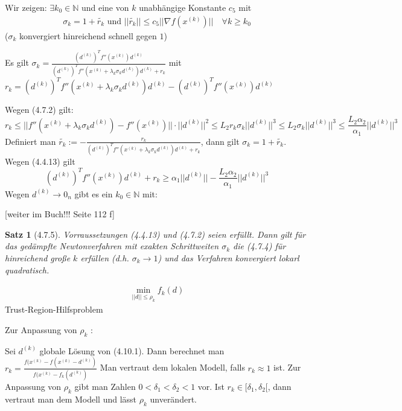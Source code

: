 \documentclass[ngerman,halfparskip]{scrartcl}
\newtheorem*{satz}{Satz}
\theoremstyle{definition}
\newcommand*{\N}{\mathbb{N}}      %
\begin{document}
Wir zeigen: $\exists k_0\in \N$ und eine von $k$ unabhängige Konstante $c_5$ mit 
\begin{gather*}\tag{4.7.4}
\sigma_k=1+\tilde{r_k} \text{ und } ||\tilde{r_k}||\leq c_5||\nabla f (x^{(k)})|| \quad \forall k\geq k_0
\end{gather*}
 ($\sigma_k$ konvergiert hinreichend schnell gegen $1$)
 
 Es gilt $\sigma_k=\frac{(d^{(k)})^Tf''(x^{(k)}) d^{(k)}}{(d^{(k)})^Tf''(x^{(k)}+\lambda_k \sigma_k d^{(k)}) d^{(k)}+r_k}$ mit $r_k=(d^{(k)})^Tf''(x^{(k)}+\lambda_k \sigma_k d^{(k)}) d^{(k)}-(d^{(k)})^Tf''(x^{(k)}) d^{(k)}$
 
 Wegen (4.7.2) gilt:
 $$r_k\leq ||f''(x^{(k)}+\lambda_k \sigma_k d^{(k)})-f''(x^{(k)}) ||\cdot ||d^{(k)}||^2 \leq L_2r_k\sigma_k||d^{(k)}||^3 \leq L_2\sigma_k||d^{(k)}||^3\leq \frac{L_2\alpha_2}{\alpha_1}||d^{(k)}||^3$$
 Definiert man $\tilde{r_k}:=-\frac{r_k}{(d^{(k)})^Tf''(x^{(k)}+\lambda_k \sigma_k d^{(k)}) d^{(k)}+r_k}$, dann gilt $\sigma_k=1+\tilde{r_k}$. Wegen (4.4.13) gilt
 $$(d^{(k)})^Tf''(x^{(k)}) d^{(k)}+r_k\geq \alpha_1 ||d^{(k)}||-\frac{L_2\alpha_2}{\alpha_1}||d^{(k)}||^3$$
 Wegen $d^{(k)}\rightarrow 0_n$ gibt es ein $k_0\in\N $ mit:
 
 [weiter im Buch!!! Seite 112 f]


\begin{satz}[4.7.5]
Vorraussetzungen (4.4.13) und (4.7.2) seien erfüllt. Dann gilt für das gedämpfte Newtonverfahren mit exakten Schrittweiten $\sigma_k$ die (4.7.4) für hinreichend große $k$ erfüllen (d.h. $\sigma_k\rightarrow 1$) und das Verfahren konvergiert lokarl quadratisch.
\end{satz}



























\begin{gather*}\tag{4.10.1}
\min\limits_{||d||\leq \rho_k}f_k(d)
\end{gather*}
Trust-Region-Hilfsproblem

Zur Anpassung von $\rho_k$ :

Sei $d^{(k)}$ globale Lösung von (4.10.1). Dann berechnet man\\
$r_k=\frac{f(x^{(k)}-f(x^{(k)}-d^{(k)})}{f(x^{(k)}-f_k(d^{(k)})}$ Man vertraut dem lokalen Modell, falls $r_k \approx 1$ ist. Zur Anpassung von $\rho_k$ gibt man Zahlen $0<\delta_1 < \delta_2 <1$ vor. Ist $r_k\in[\delta_1,\delta_2[$, dann vertraut man dem Modell und lässt $\rho_k$ unverändert.
\end{document}
